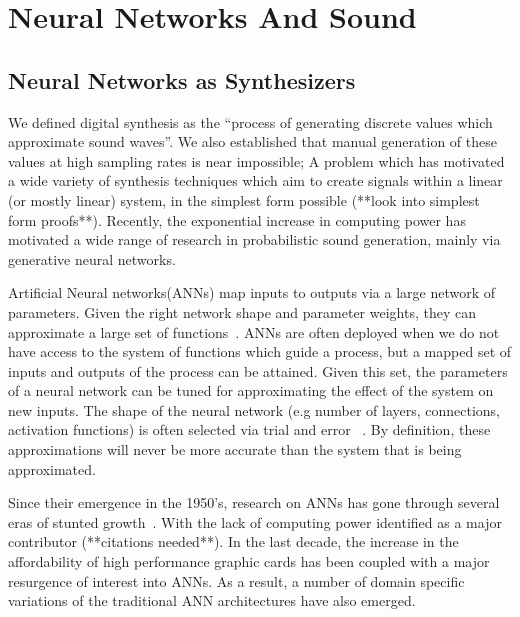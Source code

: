 \documentclass[\main/thesis.tex]{subfiles}
\begin{document}
\section{Neural Networks And Sound}
\label{bg:NN}

\subsection{Neural Networks as Synthesizers}
We defined digital synthesis as the \enquote{process of generating discrete values which approximate sound waves}. We also established that manual generation of these values at high sampling rates is near impossible; A problem which has motivated a wide variety of synthesis techniques which aim to create signals within a linear (or mostly linear) system, in the simplest form possible (**look into simplest form proofs**). Recently, the exponential increase in computing power has motivated a wide range of research in probabilistic sound generation, mainly via generative neural networks. 

Artificial Neural networks(ANNs) map inputs to outputs via a large network of parameters. Given the right network shape and parameter weights, they can approximate a large set of functions~\cite{cybenko1989approximation,cardaliaguet1992approximation}. ANNs are often deployed when we do not have access to the system of functions which guide a process, but a mapped set of inputs and outputs of the process can be attained. Given this set, the parameters of a neural network can be tuned for approximating the effect of the system on new inputs. The shape of the neural network (e.g number of layers, connections, activation functions) is often selected via trial and error ~\cite{bergstra2012random,bergstra2011algorithms,ba2013adaptive}. By definition, these approximations will never be more accurate than the system that is being approximated. 

Since their emergence in the 1950's, research on ANNs has gone through several eras of stunted growth~\cite{basheer2000artificial,anderson1988neurocomputing}. With the lack of computing power identified as a major contributor (**citations needed**). In the last decade, the increase in the affordability of high performance graphic cards has been coupled with a major resurgence of interest into ANNs. As a result, a number of domain specific variations of the traditional ANN architectures have also emerged. 
\end{document}
